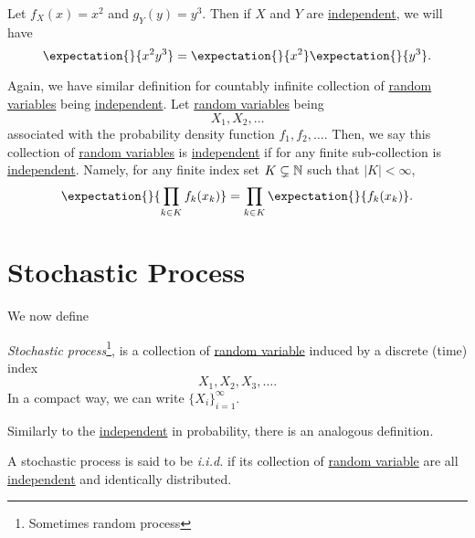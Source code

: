 \begin{eg}
	Let \(f_X(x) = x^2\) and \(g_Y(y) = y^3\). Then if \(X\) and \(Y\) are \hyperref[def:independent]{independent}, we will have
	\[
		\expectation{}{x^2 y^3} = \expectation{}{x^2} \expectation{}{y^3}.
	\]
\end{eg}

\begin{remark}
	Again, we have similar definition for countably infinite collection of \hyperref[def:random-variable]{random variables} being \hyperref[def:independent]{independent}.
	Let \hyperref[def:random-variable]{random variables} being
	\[
		X_1, X_2, \ldots
	\]
	associated with the probability density function \(f_1, f_2, \ldots\). Then, we say this collection of \hyperref[def:random-variable]{random variables} is \hyperref[def:independent]{independent}
	if for any finite sub-collection is \hyperref[def:independent]{independent}. Namely, for any finite index set \(K\subsetneq\mathbb{\MakeUppercase{N}}\) such that \(\left\vert K \right\vert < \infty \),
	\[
		\expectation{}{\prod\limits_{k\in K} f_k(x_k)} = \prod\limits_{k\in K} \expectation{}{f_k(x_k)}.
	\]
\end{remark}

\section{Stochastic Process}
We now define
\begin{definition}\label{def:stochastic-process}
	\emph{Stochastic process}\footnote{Sometimes random process}, is a collection of \hyperref[def:random-variable]{random variable} induced by a discrete (time) index
	\[
		X_1, X_2, X_3, \ldots.
	\]
	In a compact way, we can write \(\{X_i\}_{i = 1}^{\infty }\).
\end{definition}

Similarly to the \hyperref[def:independent]{independent} in probability, there is an analogous definition.

\begin{definition}[i.i.d.]\label{def:i.i.d.}
	A stochastic process is said to be \emph{i.i.d.} if its collection of \hyperref[def:random-variable]{random variable} are all \hyperref[def:independent]{independent}
	and identically distributed.
\end{definition}